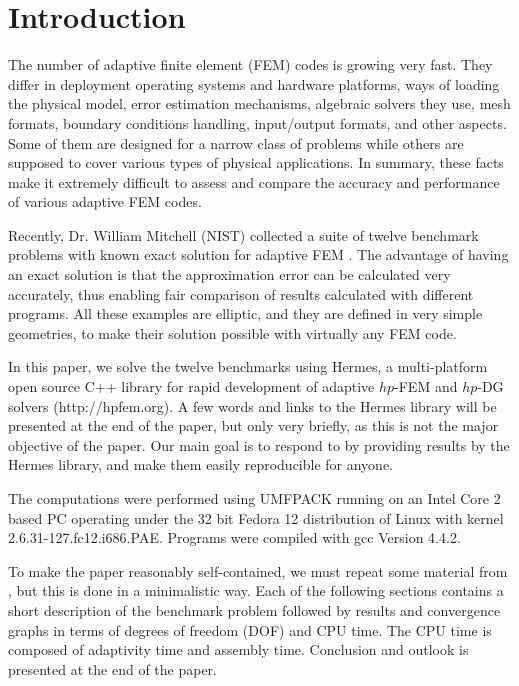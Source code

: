 \documentclass[12pt]{elsarticle}
\begin{document}
\section{Introduction}
\label{sec:intro}

The number of adaptive finite element (FEM) codes is growing very fast.
They differ in deployment operating systems and hardware platforms,
ways of loading the physical model, error estimation mechanisms,
algebraic solvers they use, mesh formats, boundary conditions
handling, input/output formats, and other aspects. Some of them are
designed for a narrow class of problems while others are supposed to
cover various types of physical applications. In summary, these facts
make it extremely difficult to assess and compare the accuracy and
performance of various adaptive FEM codes.

Recently, Dr. William Mitchell (NIST) collected a suite of
twelve benchmark problems with known exact solution for adaptive
FEM \cite{mitchell-1}. The advantage of having an exact solution is that
the approximation error can be calculated very accurately, thus
enabling fair comparison of results calculated with different
programs. All these examples are elliptic, and they are defined
in very simple geometries, to make their solution possible with
virtually any FEM code.

In this paper, we solve the twelve benchmarks using
Hermes, a multi-platform open source C++
library for rapid development of adaptive $hp$-FEM
and $hp$-DG solvers (http://hpfem.org). A few words
and links to the Hermes library will be presented at the
end of the paper, but only very briefly, as this is not
the major objective of the paper. Our main goal is to
respond to \cite{mitchell-1} by providing results by
the Hermes library, and make them easily reproducible
for anyone.

The computations were performed using UMFPACK
running on an Intel Core 2 based PC operating
under the 32 bit Fedora 12 distribution of Linux with kernel 2.6.31-127.fc12.i686.PAE.
Programs were compiled with gcc Version 4.4.2.

To make the paper reasonably self-contained, we must repeat some
material from \cite{mitchell-1}, but this is done in a minimalistic way.
Each of the following sections contains a short description of
the benchmark problem followed by results and convergence graphs in terms of degrees
of freedom (DOF) and CPU time. The CPU time is composed of adaptivity time and assembly time.
Conclusion and outlook is presented at the end of the paper.
\end{document}
